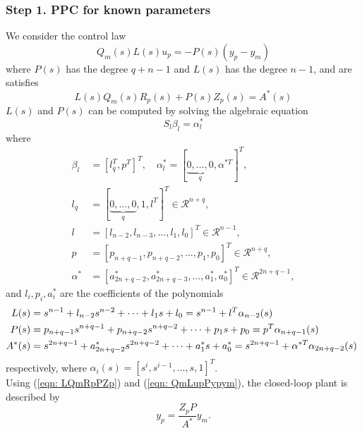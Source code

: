 \documentclass[10pt]{article}
\begin{document}
\begin{multicols*}{2}
\subsubsection{Step 1. PPC for known parameters}
We consider the control law
\begin{equation}
	Q_m(s) L(s) u_p=-P(s)\left(y_p-y_m\right)
	\label{eqn: QmLupPypym}
\end{equation}
where $P(s)$ has the degree $q+n-1$ and $L(s)$ has the degree $n-1$, and are satisfies
\begin{equation}
	L(s) Q_m(s) R_p(s)+P(s) Z_p(s)=A^*(s)
	\label{eqn: LQmRpPZp}
\end{equation}
$L(s)$ and $P(s)$ can be computed by solving the algebraic equation
\begin{equation}
	S_l \beta_l=\alpha_l^*
	\label{eqn: SLbeta}
\end{equation}
where
\begin{equation*}
	\begin{split}
		\beta_l  & =\left[l_q^T, p^T\right]^T, \quad \alpha_l^*=[\underbrace{0, \ldots, 0}_q, \alpha^{* T}]^T,   \\
		l_q      & =[\underbrace{0, \ldots, 0}_q, 1, l^T]^T \in \mathcal{R}^{n+q},                               \\
		l        & =\left[l_{n-2}, l_{n-3}, \ldots, l_1, l_0\right]^T \in \mathcal{R}^{n-1},                     \\
		p        & =\left[p_{n+q-1}, p_{n+q-2}, \ldots, p_1, p_0\right]^T \in \mathcal{R}^{n+q},                 \\
		\alpha^* & =\left[a_{2 n+q-2}^*, a_{2 n+q-3}^*, \ldots, a_1^*, a_0^*\right]^T \in \mathcal{R}^{2 n+q-1},
	\end{split}
\end{equation*}
and $l_i, p_i, a_i^*$ are the coefficients of the polynomials
\begin{equation*}
	\resizebox{1.1\columnwidth}{!}{%
		$\begin{aligned}
			L(s)   & =s^{n-1}+l_{n-2} s^{n-2}+\cdots+l_1 s+l_0=s^{n-1}+l^T \alpha_{n-2}(s)                                    \\
			P(s)   & =p_{n+q-1} s^{n+q-1}+p_{n+q-2} s^{n+q-2}+\cdots+p_1 s+p_0=p^T \alpha_{n+q-1}(s)                          \\
			A^*(s) & =s^{2 n+q-1}+a_{2 n+q-2}^* s^{2 n+q-2}+\cdots+a_1^* s+a_0^*=s^{2 n+q-1}+\alpha^{* T} \alpha_{2 n+q-2}(s)
		\end{aligned}$
	}
\end{equation*}
respectively, where $\alpha_i(s)=\left[s^i, s^{i-1}, \ldots, s, 1\right]^T$.
\\
Using (\ref{eqn: LQmRpPZp}) and (\ref{eqn: QmLupPypym}), the closed-loop plant is described by
\begin{equation}
	y_p=\frac{Z_p P}{A^*} y_m .
\end{equation}


\end{multicols*}
\end{document}
